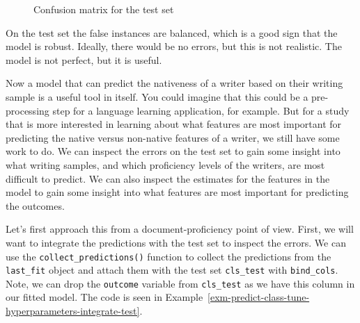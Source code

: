 \documentclass[
  letterpaper,
  krantz1]{latex/krantz-mod}
\theoremstyle{definition}
\theoremstyle{definition}
\theoremstyle{remark}
\begin{document}
\begin{figure}[!htb]


\caption{\label{fig-class-tune-hyperparameters-evaluate-workflow-cv-confusion}Confusion
matrix for the test set}

\end{figure}%

On the test set the false instances are balanced, which is a good sign
that the model is robust. Ideally, there would be no errors, but this is
not realistic. The model is not perfect, but it is useful.

Now a model that can predict the nativeness of a writer based on their
writing sample is a useful tool in itself. You could imagine that this
could be a pre-processing step for a language learning application, for
example. But for a study that is more interested in learning about what
features are most important for predicting the native versus non-native
features of a writer, we still have some work to
do. We can inspect the errors on the test set
to gain some insight into what writing samples, and which proficiency
levels of the writers, are most difficult to predict. We can also
inspect the estimates for the features in the model to gain some insight
into what features are most important for predicting the outcomes.

Let's first approach this from a document-proficiency point of view.
First, we will want to integrate the predictions with the test set to
inspect the errors. We can use the \texttt{collect\_predictions()}
function to collect the predictions from the \texttt{last\_fit} object
and attach them with the test set \texttt{cls\_test} with
\texttt{bind\_cols}. Note, we can drop the \texttt{outcome} variable
from \texttt{cls\_test} as we have this column in our fitted model. The
code is seen in
Example~\ref{exm-predict-class-tune-hyperparameters-integrate-test}.
\end{document}

